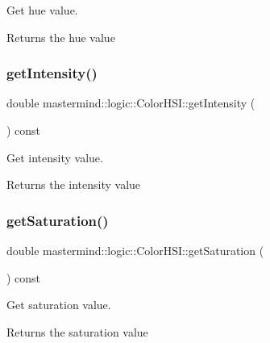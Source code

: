 Get hue value. 

\begin{DoxyReturn}{Returns}
the hue value 
\end{DoxyReturn}
\hypertarget{classmastermind_1_1logic_1_1_color_h_s_i_ab19f6d65c2b7a458de084738d017342a}{}\label{classmastermind_1_1logic_1_1_color_h_s_i_ab19f6d65c2b7a458de084738d017342a} 
\subsubsection{\texorpdfstring{get\+Intensity()}{getIntensity()}}
{\footnotesize\ttfamily double mastermind\+::logic\+::\+Color\+H\+S\+I\+::get\+Intensity (\begin{DoxyParamCaption}{ }\end{DoxyParamCaption}) const}



Get intensity value. 

\begin{DoxyReturn}{Returns}
the intensity value 
\end{DoxyReturn}
\hypertarget{classmastermind_1_1logic_1_1_color_h_s_i_a87b20bf4081e02865f648b1acc6e9b72}{}\label{classmastermind_1_1logic_1_1_color_h_s_i_a87b20bf4081e02865f648b1acc6e9b72} 
\subsubsection{\texorpdfstring{get\+Saturation()}{getSaturation()}}
{\footnotesize\ttfamily double mastermind\+::logic\+::\+Color\+H\+S\+I\+::get\+Saturation (\begin{DoxyParamCaption}{ }\end{DoxyParamCaption}) const}



Get saturation value. 

\begin{DoxyReturn}{Returns}
the saturation value 
\end{DoxyReturn}
\hypertarget{classmastermind_1_1logic_1_1_color_h_s_i_a4364b93554d63622bea84177ae3b685a}{}\label{classmastermind_1_1logic_1_1_color_h_s_i_a4364b93554d63622bea84177ae3b685a} 

